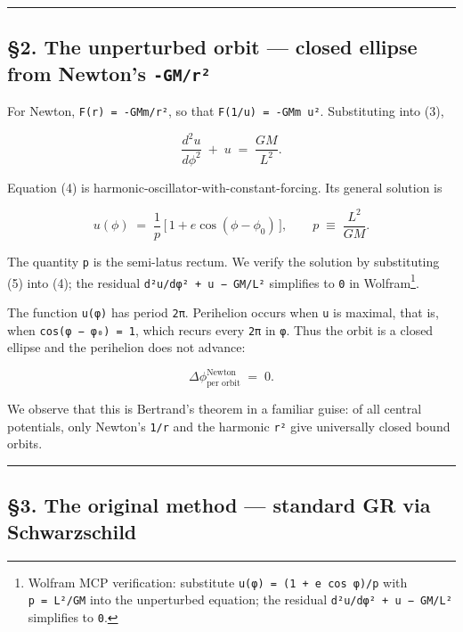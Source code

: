 \documentclass[
  11pt,
]{article}
\begin{document}
\begin{center}\rule{0.5\linewidth}{0.5pt}\end{center}

\hypertarget{the-unperturbed-orbit-closed-ellipse-from-newtons--gmruxb2}{%
\subsection{\texorpdfstring{§2. The unperturbed orbit --- closed ellipse
from Newton's
\texttt{-GM/r²}}{§2. The unperturbed orbit --- closed ellipse from Newton's -GM/r²}}\label{the-unperturbed-orbit-closed-ellipse-from-newtons--gmruxb2}}

For Newton, \texttt{F(r)\ =\ -GMm/r²}, so that
\texttt{F(1/u)\ =\ -GMm\ u²}. Substituting into (3),

\[
\frac{d^{2} u}{d\phi^{2}} \;+\; u
\;=\; \frac{GM}{L^{2}}. \tag{4}
\]

Equation (4) is harmonic-oscillator-with-constant-forcing. Its general
solution is

\[
u(\phi) \;=\; \frac{1}{p}\,\bigl[\,1 + e\cos(\phi - \phi_{0})\,\bigr],
\qquad
p \;\equiv\; \frac{L^{2}}{GM}. \tag{5}
\]

The quantity \texttt{p} is the semi-latus rectum. We verify the solution
by substituting (5) into (4); the residual
\texttt{d²u/dφ²\ +\ u\ −\ GM/L²} simplifies to \texttt{0} in
Wolfram\footnote{Wolfram MCP verification: substitute
  \texttt{u(φ)\ =\ (1\ +\ e\ cos\ φ)/p} with \texttt{p\ =\ L²/GM} into
  the unperturbed equation; the residual
  \texttt{d²u/dφ²\ +\ u\ −\ GM/L²} simplifies to \texttt{0}.}.

The function \texttt{u(φ)} has period \texttt{2π}. Perihelion occurs
when \texttt{u} is maximal, that is, when \texttt{cos(φ\ −\ φ₀)\ =\ 1},
which recurs every \texttt{2π} in \texttt{φ}. Thus the orbit is a closed
ellipse and the perihelion does not advance:

\[
\Delta\phi^{\text{Newton}}_{\text{per orbit}} \;=\; 0. \tag{6}
\]

We observe that this is Bertrand's theorem in a familiar guise: of all
central potentials, only Newton's \texttt{1/r} and the harmonic
\texttt{r²} give universally closed bound orbits.

\begin{center}\rule{0.5\linewidth}{0.5pt}\end{center}

\hypertarget{the-original-method-standard-gr-via-schwarzschild}{%
\subsection{§3. The original method --- standard GR via
Schwarzschild}\label{the-original-method-standard-gr-via-schwarzschild}}
\end{document}
